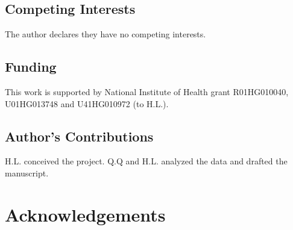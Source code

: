 \documentclass[a4paper,num-refs]{oup-contemporary}
\begin{document}
\subsection{Competing Interests}

The author declares they have no competing interests.

\subsection{Funding}

This work is supported by National Institute of Health grant R01HG010040, U01HG013748 and U41HG010972 (to H.L.).

\subsection{Author's Contributions}

H.L. conceived the project.
Q.Q and H.L. analyzed the data and drafted the manuscript.

\section{Acknowledgements}


\end{document}
